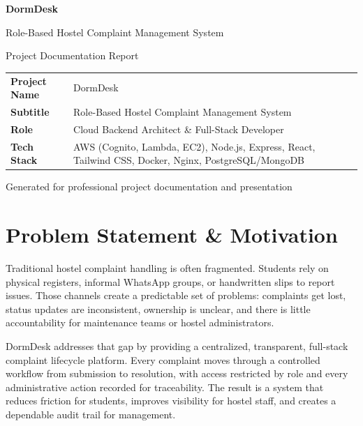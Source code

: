 \documentclass[11pt,a4paper]{article}
\begin{document}
\begin{titlepage}
  \centering
  \vspace*{1.5cm}
  {\Huge\bfseries\color{DormDeskBlue} DormDesk\par}
  \vspace{0.35cm}
  {\Large\color{DormDeskSlate} Role-Based Hostel Complaint Management System\par}
  \vspace{1.4cm}
  {\large\color{DormDeskSlate}Project Documentation Report\par}
  \vspace{1.8cm}

  \begin{table}[H]
    \centering
    \renewcommand{\arraystretch}{1.35}
    \begin{tabular}{>{\bfseries}p{} p{}}
      \toprule
      Project Name & DormDesk \\
      Subtitle & Role-Based Hostel Complaint Management System \\
      Role & Cloud Backend Architect \& Full-Stack Developer \\
      Tech Stack & AWS (Cognito, Lambda, EC2), Node.js, Express, React, Tailwind CSS, Docker, Nginx, PostgreSQL/MongoDB \\
      \bottomrule
    \end{tabular}
  \end{table}

  \vfill
  {\large\color{DormDeskSlate}Generated for professional project documentation and presentation\par}
\end{titlepage}

\tableofcontents
\newpage

\section{Problem Statement \& Motivation}
Traditional hostel complaint handling is often fragmented. Students rely on physical registers, informal WhatsApp groups, or handwritten slips to report issues. Those channels create a predictable set of problems: complaints get lost, status updates are inconsistent, ownership is unclear, and there is little accountability for maintenance teams or hostel administrators.

DormDesk addresses that gap by providing a centralized, transparent, full-stack complaint lifecycle platform. Every complaint moves through a controlled workflow from submission to resolution, with access restricted by role and every administrative action recorded for traceability. The result is a system that reduces friction for students, improves visibility for hostel staff, and creates a dependable audit trail for management.
\end{document}
